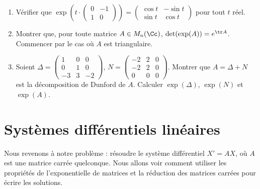 \documentclass[12pt, class=report,crop=false]{standalone}
\begin{document}
\begin{miniexercices}
\sauteligne
\begin{enumerate}

  \item Vérifier que
$\exp \left(t \cdot 
\left(\begin{smallmatrix}
0 & -1\\
 1& 0
\end{smallmatrix}\right)\right) = 
\left(\begin{smallmatrix}
\cos t &- \sin t \\
\sin t & \cos t
\end{smallmatrix}\right)$ pour tout $t$ réel.

  \item Montrer que, pour toute matrice $A \in M_n(\Cc)$, 
$\det(\exp(A)) = e^{\tr A}$. Commencer par le cas où $A$ est triangulaire.


  \item 
  Soient $\Delta = 
    \left(\begin{smallmatrix}
    1 & 0 & 0 \\
0 & 1 & 0 \\
-3 & 3 & -2
      \end{smallmatrix}\right)$,
 $N =
  \left(\begin{smallmatrix} 
-2 & 2 & 0 \\
-2 & 2 & 0 \\
0 & 0 & 0
  \end{smallmatrix}\right)$.     
  Montrer que $A = \Delta + N$ est la décomposition de Dunford de $A$.
  Calculer $\exp(\Delta)$, $\exp(N)$ et $\exp(A)$.
  
  
\end{enumerate}
\end{miniexercices}




\section{Systèmes différentiels linéaires}

Nous revenons à notre problème : résoudre le système différentiel $X'=AX$, 
où $A$ est une matrice carrée quelconque.
Nous allons voir comment utiliser les propriétés 
de l'exponentielle de matrices et la réduction des matrices 
carrées pour écrire les solutions. 

\end{document}
